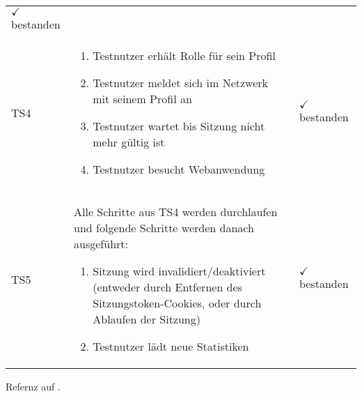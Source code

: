 \begin{longtable}[c]{p{1cm} p{9cm} p{4cm}}
\begin{minipage}[t]{4cm}
		\textcolor{applegreen}{$ \checkmark $ } bestanden
	\end{minipage}  \\ 
	TS4 &
	\begin{minipage}[t]{9cm}
		\begin{enumerate}
			\item Testnutzer erhält Rolle für sein Profil
			\item Testnutzer meldet sich im Netzwerk mit seinem Profil an
			\item Testnutzer wartet bis Sitzung nicht mehr gültig ist
			\item Testnutzer besucht Webanwendung
		\end{enumerate}
	\end{minipage}  & 
	\begin{minipage}[t]{4cm}
		\textcolor{applegreen}{$ \checkmark $ } bestanden
	\end{minipage}  \\ 
	TS5 &
	\begin{minipage}[t]{9cm}
		Alle Schritte aus TS4 werden durchlaufen und folgende Schritte werden danach ausgeführt:
		\begin{enumerate}
			\item Sitzung wird invalidiert/deaktiviert (entweder durch Entfernen des Sitzungstoken-Cookies, oder durch Ablaufen der Sitzung)
			\item Testnutzer lädt neue Statistiken
		\end{enumerate}
	\end{minipage}  & 
	\begin{minipage}[t]{4cm}
		\textcolor{applegreen}{$ \checkmark $ } bestanden
	\end{minipage}  \\
	\bottomrule     
\end{longtable}

Refernz auf \cite{augsten_2017_was}.